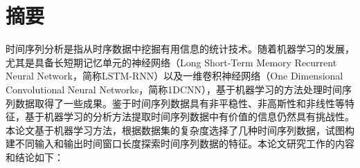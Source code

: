 \setlength{\headheight}{26pt}
\maketitle %
\MAKETITLE %
\makedeclaration %

\intobmk\chapter*{\texorpdfstring{摘\quad 要}{摘要}}
\setcounter{page}{1}
时间序列分析是指从时序数据中挖掘有用信息的统计技术。随着机器学习的发展，尤其是具备长短期记忆单元的神经网络（Long Short-Term Memory Recurrent Neural Network，简称LSTM-RNN）以及一维卷积神经网络（One Dimensional Convolutional Neural Networks，简称1DCNN），基于机器学习的方法处理时间序列数据取得了一些成果。鉴于时间序列数据具有非平稳性、非高斯性和非线性等特征，基于机器学习的分析方法提取时间序列数据中有价值的信息仍然具有挑战性。本论文基于机器学习方法，根据数据集的复杂度选择了几种时间序列数据，试图构建不同输入和输出时间窗口长度探索时间序列数据的特征。本论文研究工作的内容和结论如下：
